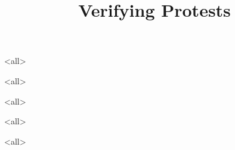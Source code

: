 \title{%
  Verifying Protests
}

\maketitle

\mode*

\begin{abstract}
  
\end{abstract}

\clearpage
\tableofcontents
\clearpage

\mode<all>


\mode<all>


\mode<all>

\mode<all>

\mode<all>




\begin{frame}
  \printbibliography{}
\end{frame}
